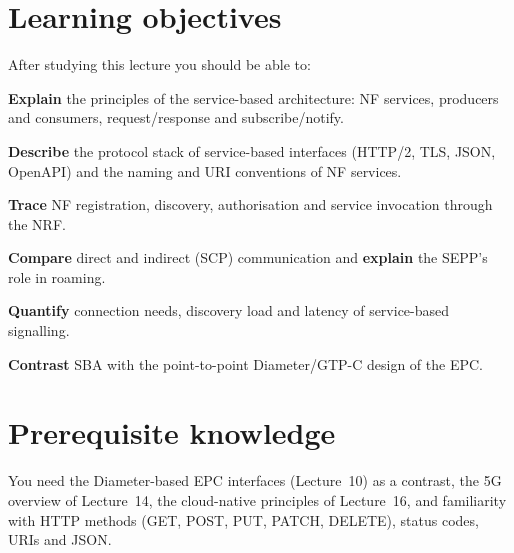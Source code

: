 \documentclass[11pt,a4paper]{article}
\begin{document}
\ACNcover

\section{Learning objectives}
After studying this lecture you should be able to:
\begin{objectives}
  \item \textbf{Explain} the principles of the service-based architecture: NF services, producers and consumers,
        request/response and subscribe/notify.
  \item \textbf{Describe} the protocol stack of service-based interfaces (HTTP/2, TLS, JSON, OpenAPI) and the naming
        and URI conventions of NF services.
  \item \textbf{Trace} NF registration, discovery, authorisation and service invocation through the NRF.
  \item \textbf{Compare} direct and indirect (SCP) communication and \textbf{explain} the SEPP's role in roaming.
  \item \textbf{Quantify} connection needs, discovery load and latency of service-based signalling.
  \item \textbf{Contrast} SBA with the point-to-point Diameter/GTP-C design of the EPC.
\end{objectives}

\section{Prerequisite knowledge}
You need the Diameter-based EPC interfaces (Lecture~10) as a contrast, the 5G overview of Lecture~14, the
cloud-native principles of Lecture~16, and familiarity with HTTP methods (GET, POST, PUT, PATCH, DELETE), status codes,
URIs and JSON.
\end{document}
